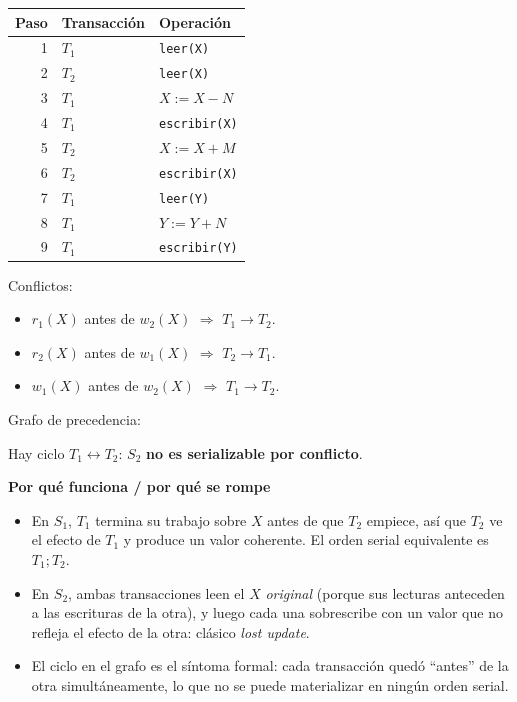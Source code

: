 \documentclass[11pt,a4paper]{article}
\newcommand{\itemcabecera}[1]{\noindent\textbf{#1}\par\medskip}
\newcommand{\bloquePorque}{\itemcabecera{Por qu\'e funciona / por qu\'e se rompe}}
\begin{document}
\begin{center}
\begin{tabular}{rll}
\toprule
Paso & Transacción & Operación \\
\midrule
1 & $T_1$ & \texttt{leer(X)} \\
2 & $T_2$ & \texttt{leer(X)} \\
3 & $T_1$ & $X := X - N$ \\
4 & $T_1$ & \texttt{escribir(X)} \\
5 & $T_2$ & $X := X + M$ \\
6 & $T_2$ & \texttt{escribir(X)} \\
7 & $T_1$ & \texttt{leer(Y)} \\
8 & $T_1$ & $Y := Y + N$ \\
9 & $T_1$ & \texttt{escribir(Y)} \\
\bottomrule
\end{tabular}
\end{center}

Conflictos:

\begin{itemize}
    \item $r_1(X)$ antes de $w_2(X)$ $\Rightarrow$ $T_1 \rightarrow T_2$.
    \item $r_2(X)$ antes de $w_1(X)$ $\Rightarrow$ $T_2 \rightarrow T_1$.
    \item $w_1(X)$ antes de $w_2(X)$ $\Rightarrow$ $T_1 \rightarrow T_2$.
\end{itemize}

Grafo de precedencia:
\begin{center}
\end{center}

Hay ciclo $T_1 \leftrightarrow T_2$: $S_2$ \textbf{no es serializable por conflicto}.

\bloquePorque

\begin{itemize}
    \item En $S_1$, $T_1$ termina su trabajo sobre $X$ antes de que $T_2$ empiece, así que $T_2$ ve el efecto de $T_1$ y produce un valor coherente. El orden serial equivalente es $T_1; T_2$.
    \item En $S_2$, ambas transacciones leen el $X$ \emph{original} (porque sus lecturas anteceden a las escrituras de la otra), y luego cada una sobrescribe con un valor que no refleja el efecto de la otra: clásico \emph{lost update}.
    \item El ciclo en el grafo es el síntoma formal: cada transacción quedó ``antes'' de la otra simultáneamente, lo que no se puede materializar en ningún orden serial.
\end{itemize}
\end{document}
